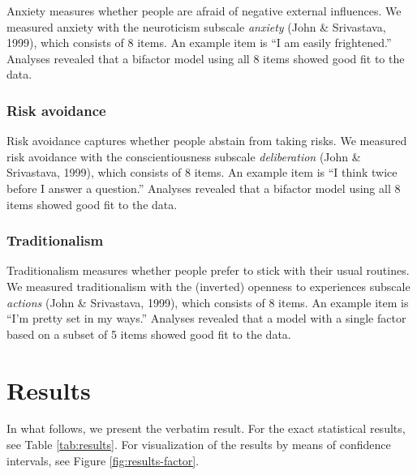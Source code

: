 \documentclass[man,floatsintext]{apa6}
\theoremstyle{definition}
\theoremstyle{definition}
\theoremstyle{definition}
\theoremstyle{remark}
\begin{document}
Anxiety measures whether people are afraid of negative external
influences. We measured anxiety with the neuroticism subscale
\emph{anxiety} (John \& Srivastava, 1999), which consists of 8 items. An
example item is \enquote{I am easily frightened.} Analyses revealed that
a bifactor model using all 8 items showed good fit to the data.

\hypertarget{risk-avoidance}{%
\subsubsection{Risk avoidance}\label{risk-avoidance}}

Risk avoidance captures whether people abstain from taking risks. We
measured risk avoidance with the conscientiousness subscale
\emph{deliberation} (John \& Srivastava, 1999), which consists of 8
items. An example item is \enquote{I think twice before I answer a
question.} Analyses revealed that a bifactor model using all 8 items
showed good fit to the data.

\hypertarget{traditionalism}{%
\subsubsection{Traditionalism}\label{traditionalism}}

Traditionalism measures whether people prefer to stick with their usual
routines. We measured traditionalism with the (inverted) openness to
experiences subscale \emph{actions} (John \& Srivastava, 1999), which
consists of 8 items. An example item is \enquote{I'm pretty set in my
ways.} Analyses revealed that a model with a single factor based on a
subset of 5 items showed good fit to the data.

\hypertarget{results}{%
\section{Results}\label{results}}

In what follows, we present the verbatim result. For the exact
statistical results, see Table \ref{tab:results}. For visualization of
the results by means of confidence intervals, see Figure
\ref{fig:results-factor}.
\end{document}
